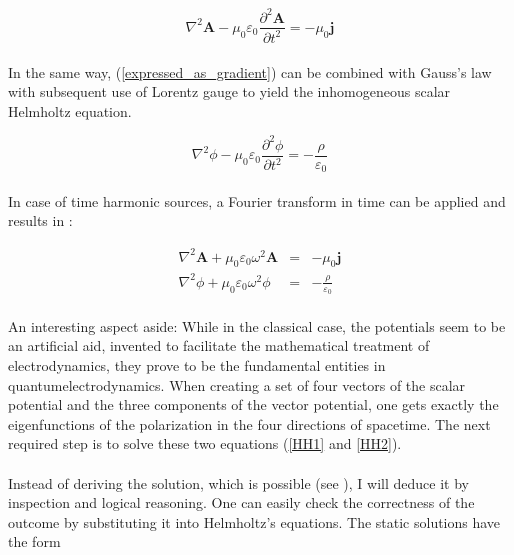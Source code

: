 \documentclass[a4paper,10pt]{thesis}
\begin{document}
\begin{equation}
\nabla^2 \mathbf{A} - \mu_0 \varepsilon_0 \frac{\partial^2 \mathbf{A}}{\partial t^2} =-\mu_0 \mathbf{j}
\end{equation}

\paragraph*{}
In the same way, (\ref{expressed_as_gradient}) can be combined with Gauss's law with subsequent use of Lorentz gauge to yield the inhomogeneous scalar Helmholtz equation.

\begin{equation}
\nabla^2 \phi - \mu_0 \varepsilon_0 \frac{\partial^2 \phi }{\partial t^2} =-\frac{\rho }{\varepsilon_0 }
\end{equation}

\paragraph*{}
In case of time harmonic sources, a Fourier transform in time can be applied and results in :

\begin{eqnarray}
\nabla^2 \mathbf{A} + \mu_0 \varepsilon_0 \omega^2 \mathbf{A}&=& -\mu_0 \mathbf{j} \label{HH1}\\
\nabla^2 \phi + \mu_0 \varepsilon_0 \omega^2 \phi  &=&-\frac{\rho }{\varepsilon_0 } \label{HH2}
\end{eqnarray}

\paragraph*{}
An interesting aspect aside: While in the classical case, the potentials seem to be an artificial aid, invented to facilitate the mathematical treatment of electrodynamics, they prove to be the fundamental entities in quantumelectrodynamics. When creating a set of four vectors of the scalar potential and the three components of the vector potential, one gets exactly the eigenfunctions of the polarization in the four directions of spacetime. The next required step is to solve these two equations (\ref{HH1} and \ref{HH2}).

\paragraph*{}
Instead of deriving the solution, which is possible (see \cite{emwaves}), I will deduce it by inspection and logical reasoning. One can easily check the correctness of the outcome by substituting it into Helmholtz's equations. The static solutions have the form
\end{document}

